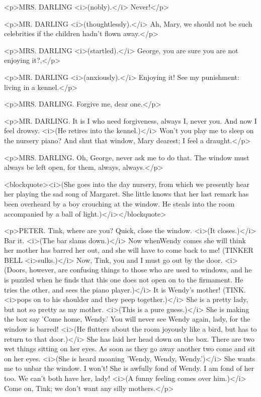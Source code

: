 <p>MRS. DARLING <i>(nobly).</i> Never!</p>

<p>MR. DARLING <i>(thoughtlessly).</i> Ah, Mary, we should not be such celebrities if the children hadn't flown away.</p>

<p>MRS. DARLING <i>(startled).</i> George, you are sure you are not enjoying it?,</p>

<p>MR. DARLING <i>(anxiously).</i> Enjoying it! See my punishment: living in a kennel.</p>

<p>MRS. DARLING. Forgive me, dear one.</p>

<p>MR. DARLING. It is I who need forgiveness, always I, never you. And now I feel drowsy. <i>(He retires into the kennel.)</i> Won't you play me to sleep on the nursery piano? And shut that window, Mary dearest; I feel a draught.</p>

<p>MRS. DARLING. Oh, George, never ask me to do that. The window must always be left open, for them, always, always.</p>

<blockquote><i>(She goes into the day nursery, from which we presently hear her playing the sad song of Margaret. She little knows that her last remark has been overheard by a boy crouching at the window. He steals into the room accompanied by a ball of light.)</i></blockquote>

<p>PETER. Tink, where are you? Quick, close the window. <i>(It closes.)</i> Bar it. <i>(The bar slams down.)</i> Now whenWendy comes she will think her mother has barred her out, and she will have to come back to me! (TINKER BELL <i>sulks.)</i> Now, Tink, you and I must go out by the door. <i>(Doors, however, are confusing things to those who are used to windows, and he is puzzled when he finds that this one does not open on to the firmament. He tries the other, and sees the piano player.)</i> It is Wendy's mother! (TINK. <i>pops on to his shoulder and they peep together.)</i> She is a pretty lady, but not so pretty as my mother. <i>(This is a pure guess.)</i> She is making the box say 'Come home, Wendy.' You will never see Wendy again, lady, for the window is barred! <i>(He flutters about the room joyously like a bird, but has to return to that door.)</i> She has laid her head down on the box. There are two wet things sitting on her eyes. As soon as they go away another two come and sit on her eyes. <i>(She is heard moaning 'Wendy, Wendy, Wendy.')</i> She wants me to unbar the window. I won't! She is awfully fond of Wendy. I am fond of her too. We can't both have her, lady! <i>(A funny feeling comes over him.)</i> Come on, Tink; we don't want any silly mothers.</p>

